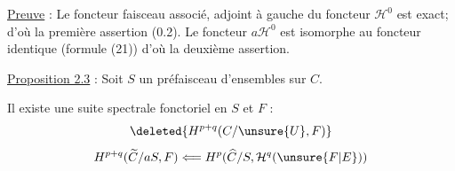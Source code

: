 \uline{Preuve} : Le foncteur faisceau associé, adjoint à gauche du foncteur $\mathcal H^0$ est exact; d'où la première assertion (0.2). Le foncteur $a\mathcal H^0$ est isomorphe au foncteur identique (formule (21)) d'où la deuxième assertion.

\uline{Proposition 2.3} : Soit $S$ un préfaisceau d'ensembles sur $C$.

Il existe une suite spectrale fonctoriel en $S$ et $F$ :
\[\deleted{H^{p+q}(C/\unsure{U},F)}\]
\[H^{p+q}(\widetilde C/aS,F)\Longleftarrow H^p(\widehat C/S,\mathcal H^q(\unsure{F|E}))\]
